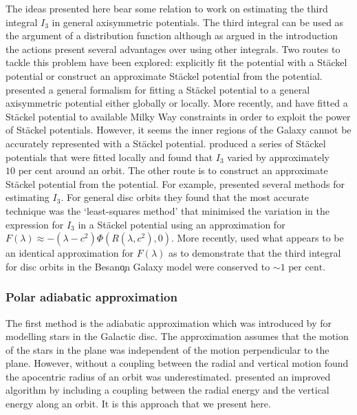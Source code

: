\documentclass[useAMS,usenatbib,fleqn,a4paper]{mn2e}
\def\percent{\text{ per cent}}
\def\percent{\text{ per cent}}
\begin{document}
The ideas presented here bear some relation to work on estimating the third integral $I_3$ in general axisymmetric potentials. The third integral can be used as the argument of a distribution function although as argued in the introduction the actions present several advantages over using other integrals. Two routes to tackle this problem have been explored: explicitly fit the potential with a St\"ackel potential or construct an approximate St\"ackel potential from the potential. \cite{DejonghedeZeeuw1988} presented a general formalism for fitting a St\"ackel potential to a general axisymmetric potential either globally or locally. More recently, \cite{BatsleerDejonghe} and \cite{Famaey2003} have fitted a St\"ackel potential to available Milky Way constraints in order to exploit the power of St\"ackel potentials. However, it seems the inner regions of the Galaxy cannot be accurately represented with a St\"ackel potential. \cite{deBruyne2000} produced a series of St\"ackel potentials that were fitted locally and found that $I_3$ varied by approximately $10\percent$ around an orbit. The other route is to construct an approximate St\"ackel potential from the potential. For example, \cite{KentdeZeeuw1991} presented several methods for estimating $I_3$. For general disc orbits they found that the most accurate technique was the `least-squares method' that minimised the variation in the expression for $I_3$ in a St\"ackel potential using an approximation for $F(\lambda)\approx-(\lambda-c^2)\Phi(R(\lambda,c^2),0)$. More recently, \cite{Bienayme2015} used what appears to be an identical approximation for $F(\lambda)$ as \cite{KentdeZeeuw1991} to demonstrate that the third integral for disc orbits in the Besan\c on Galaxy model were conserved to $\sim 1\percent$.

\subsubsection{Polar adiabatic approximation}\label{Method::PAA}
The first method is the adiabatic approximation which was introduced by \cite{Binney2010} for modelling stars in the Galactic disc. The approximation assumes that the motion of the stars in the plane was independent of the motion perpendicular to the plane. However, without a coupling between the radial and vertical motion \citet{BinneyMcMillan2011} found the apocentric radius of an orbit was underestimated. \citet{Schonrich2012} presented an improved algorithm by including a coupling between the radial energy and the vertical energy along an orbit. It is this  approach that we present here.
\end{document}
